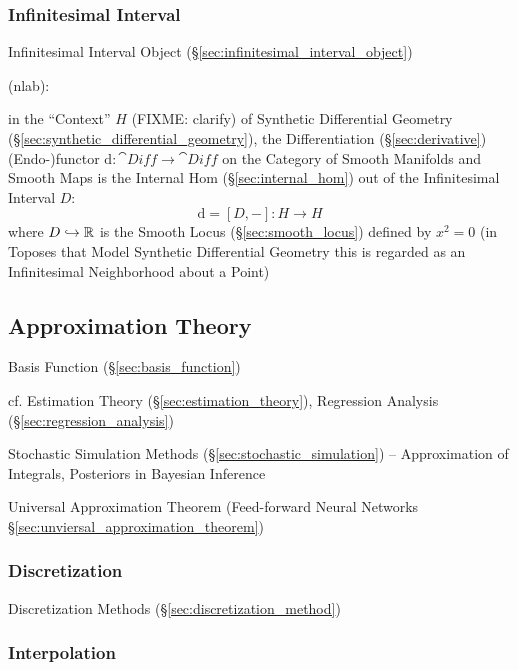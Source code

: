 \subsubsection{Infinitesimal Interval}\label{sec:infinitesimal_interval}

\fist Infinitesimal Interval Object (\S\ref{sec:infinitesimal_interval_object})

(nlab):

in the ``Context'' $H$ (FIXME: clarify) of Synthetic Differential Geometry
(\S\ref{sec:synthetic_differential_geometry}), the Differentiation
(\S\ref{sec:derivative}) (Endo-)functor $\mathrm{d} : \cat{Diff} \rightarrow
\cat{Diff}$ on the Category of Smooth Manifolds and Smooth Maps is the Internal
Hom (\S\ref{sec:internal_hom}) out of the Infinitesimal Interval $D$:
\[
  \mathrm{d} = [D,-] : H \rightarrow H
\]
where $D \hookrightarrow \mathbb{R}$ is the Smooth Locus (\S\ref{sec:smooth_locus})
defined by $x^2 = 0$ (in Toposes that Model Synthetic Differential Geometry this
is regarded as an Infinitesimal Neighborhood about a Point)



\subsection{Approximation Theory}\label{sec:approximation_theory}

Basis Function (\S\ref{sec:basis_function})

\fist cf. Estimation Theory (\S\ref{sec:estimation_theory}), Regression Analysis
(\S\ref{sec:regression_analysis})

Stochastic Simulation Methods (\S\ref{sec:stochastic_simulation}) --
Approximation of Integrals, Posteriors in Bayesian Inference

\fist Universal Approximation Theorem (Feed-forward Neural Networks
\S\ref{sec:unviersal_approximation_theorem})



\subsubsection{Discretization}\label{sec:discretization}

Discretization Methods (\S\ref{sec:discretization_method})



\subsubsection{Interpolation}\label{sec:interpolation}

